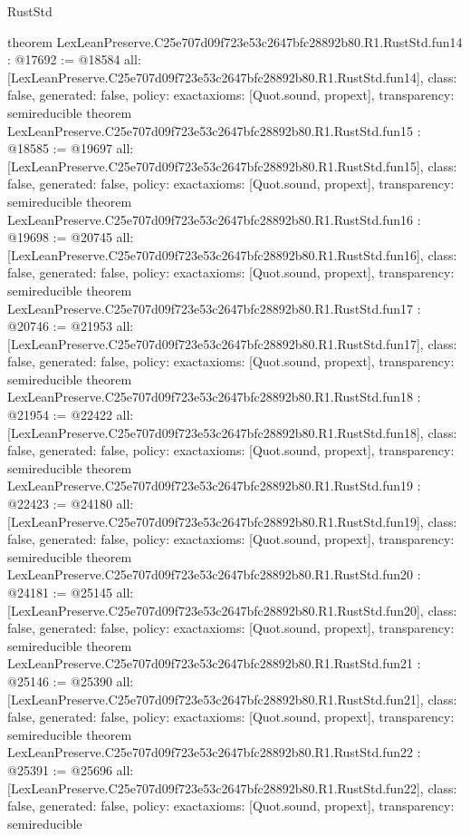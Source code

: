 \begin{lexlean}{RustStd}
\begin{coremodule}
{}
theorem LexLeanPreserve.C25e707d09f723e53c2647bfc28892b80.R1.RustStd.fun14 : @17692 := @18584 {
  all: [LexLeanPreserve.C25e707d09f723e53c2647bfc28892b80.R1.RustStd.fun14],
  class: false,
  generated: false,
  policy: exact{axioms: [Quot.sound, propext]},
  transparency: semireducible
}
theorem LexLeanPreserve.C25e707d09f723e53c2647bfc28892b80.R1.RustStd.fun15 : @18585 := @19697 {
  all: [LexLeanPreserve.C25e707d09f723e53c2647bfc28892b80.R1.RustStd.fun15],
  class: false,
  generated: false,
  policy: exact{axioms: [Quot.sound, propext]},
  transparency: semireducible
}
theorem LexLeanPreserve.C25e707d09f723e53c2647bfc28892b80.R1.RustStd.fun16 : @19698 := @20745 {
  all: [LexLeanPreserve.C25e707d09f723e53c2647bfc28892b80.R1.RustStd.fun16],
  class: false,
  generated: false,
  policy: exact{axioms: [Quot.sound, propext]},
  transparency: semireducible
}
theorem LexLeanPreserve.C25e707d09f723e53c2647bfc28892b80.R1.RustStd.fun17 : @20746 := @21953 {
  all: [LexLeanPreserve.C25e707d09f723e53c2647bfc28892b80.R1.RustStd.fun17],
  class: false,
  generated: false,
  policy: exact{axioms: [Quot.sound, propext]},
  transparency: semireducible
}
theorem LexLeanPreserve.C25e707d09f723e53c2647bfc28892b80.R1.RustStd.fun18 : @21954 := @22422 {
  all: [LexLeanPreserve.C25e707d09f723e53c2647bfc28892b80.R1.RustStd.fun18],
  class: false,
  generated: false,
  policy: exact{axioms: [Quot.sound, propext]},
  transparency: semireducible
}
theorem LexLeanPreserve.C25e707d09f723e53c2647bfc28892b80.R1.RustStd.fun19 : @22423 := @24180 {
  all: [LexLeanPreserve.C25e707d09f723e53c2647bfc28892b80.R1.RustStd.fun19],
  class: false,
  generated: false,
  policy: exact{axioms: [Quot.sound, propext]},
  transparency: semireducible
}
theorem LexLeanPreserve.C25e707d09f723e53c2647bfc28892b80.R1.RustStd.fun20 : @24181 := @25145 {
  all: [LexLeanPreserve.C25e707d09f723e53c2647bfc28892b80.R1.RustStd.fun20],
  class: false,
  generated: false,
  policy: exact{axioms: [Quot.sound, propext]},
  transparency: semireducible
}
theorem LexLeanPreserve.C25e707d09f723e53c2647bfc28892b80.R1.RustStd.fun21 : @25146 := @25390 {
  all: [LexLeanPreserve.C25e707d09f723e53c2647bfc28892b80.R1.RustStd.fun21],
  class: false,
  generated: false,
  policy: exact{axioms: [Quot.sound, propext]},
  transparency: semireducible
}
theorem LexLeanPreserve.C25e707d09f723e53c2647bfc28892b80.R1.RustStd.fun22 : @25391 := @25696 {
  all: [LexLeanPreserve.C25e707d09f723e53c2647bfc28892b80.R1.RustStd.fun22],
  class: false,
  generated: false,
  policy: exact{axioms: [Quot.sound, propext]},
  transparency: semireducible
}
\end{coremodule}
\end{lexlean}
